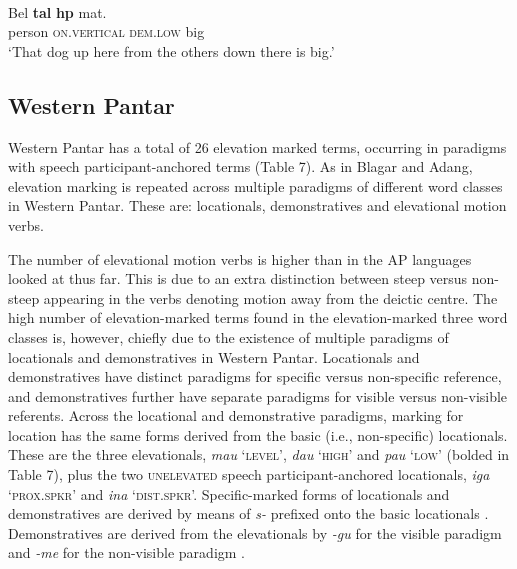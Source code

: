     

\ea%
\label{ex:7:29}
 \\
\gll  Bel  \textbf{tal{\textepsilon}} \textbf{h{\textepsilon}p{\textopeno}} mat{\textepsilon}.  \\
   person  \textsc{on.vertical} \textsc{dem.low} big    \\
\glt   `That dog up here from the others down there is big.'
\z



    



\subsection{Western Pantar}
Western Pantar has a total of 26 elevation marked terms, occurring in paradigms with speech participant-anchored terms (Table 7). As in Blagar and Adang, elevation marking is repeated across multiple paradigms of different word classes in Western Pantar. These are: locationals, demonstratives and elevational motion verbs. 

The number of elevational motion verbs is higher than in the AP languages looked at thus far. This is due to an extra distinction between steep versus non-steep appearing in the verbs denoting motion away from the deictic centre. The high number of elevation-marked terms found in the elevation-marked three word classes is, however, chiefly due to the existence of multiple paradigms of locationals and demonstratives in Western Pantar. Locationals and demonstratives have distinct paradigms for specific versus non-specific reference, and demonstratives further have separate paradigms for visible versus non-visible referents. Across the locational and demonstrative paradigms, marking for location has the same forms derived from the basic (i.e., non-specific) locationals. These are the three elevationals, \textit{mau} `\textsc{level',} \textit{dau} `\textsc{high'} and \textit{pau} `\textsc{low'} (bolded in Table 7)\textsc{,} plus the two \textsc{unelevated} speech participant-anchored locationals, \textit{iga} `\textsc{prox.spkr'} and \textit{ina} `\textsc{dist.spkr'.} Specific-marked forms of locationals and demonstratives are derived by means of \textit{s-} prefixed onto the basic locationals . Demonstratives are derived from the elevationals by \textit{{}-gu} for the visible paradigm and \textit{{}-me} for the non-visible paradigm .




